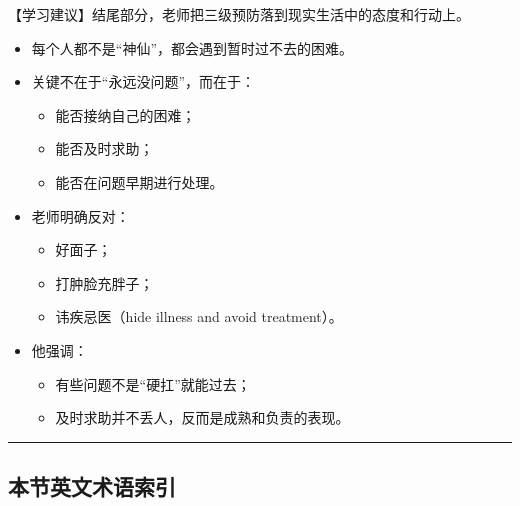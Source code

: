 \documentclass[
  chinese,
  9pt,
  a4paper,
]{ctexart}
\providecommand{\tightlist}{%
  \setlength{\itemsep}{0pt}\setlength{\parskip}{0pt}}
\begin{document}
【学习建议】结尾部分，老师把三级预防落到现实生活中的态度和行动上。

\begin{itemize}
\item
  每个人都不是``神仙''，都会遇到暂时过不去的困难。
\item
  关键不在于``永远没问题''，而在于：

  \begin{itemize}
  \tightlist
  \item
    能否接纳自己的困难；
  \item
    能否及时求助；
  \item
    能否在问题早期进行处理。
  \end{itemize}
\item
  老师明确反对：

  \begin{itemize}
  \tightlist
  \item
    好面子；
  \item
    打肿脸充胖子；
  \item
    讳疾忌医（hide illness and avoid treatment）。
  \end{itemize}
\item
  他强调：

  \begin{itemize}
  \tightlist
  \item
    有些问题不是``硬扛''就能过去；
  \item
    及时求助并不丢人，反而是成熟和负责的表现。
  \end{itemize}
\end{itemize}

\begin{center}\rule{0.5\linewidth}{0.5pt}\end{center}

\subsection{本节英文术语索引}\label{ux672cux8282ux82f1ux6587ux672fux8bedux7d22ux5f15-5}
\end{document}
